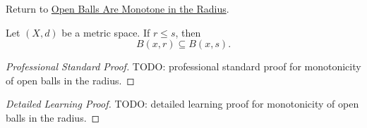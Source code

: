 \newpage
{}
\label{prf:fv-msml-ball-subset-ball}

\begin{remark*}[Return]
Return to \hyperref[thm:fv-msml-ball-subset-ball]{Open Balls Are Monotone in the Radius}.
\end{remark*}

\begin{theorem*}
Let $(X,d)$ be a metric space. If \(r\leq s\), then
\[
  B(x,r)\subseteq B(x,s).
\]
\end{theorem*}

\begin{proof}[Professional Standard Proof]
\LRAProofBodyStart
TODO: professional standard proof for monotonicity of open balls in the radius.
\end{proof}

\begin{proof}[Detailed Learning Proof]
\LRAProofBodyStart
TODO: detailed learning proof for monotonicity of open balls in the radius.
\end{proof}

\begin{remark*}
\end{remark*}

\NoLocalDependencies

\clearpage
